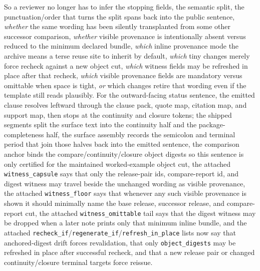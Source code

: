 \documentclass[11pt]{article}
\begin{document}
So a reviewer no longer has to infer the stopping fields, the semantic split, the punctuation/order that turns the split spans back into the public sentence, \emph{whether} the same wording has been silently transplanted from some other successor comparison, \emph{whether} visible provenance is intentionally absent versus reduced to the minimum declared bundle, \emph{which} inline provenance mode the archive means a terse reuse site to inherit by default, \emph{which} tiny changes merely force recheck against a new object cut, \emph{which} witness fields may be refreshed in place after that recheck, \emph{which} visible provenance fields are mandatory versus omittable when space is tight, \emph{or} which changes retire that wording even if the template still reads plausibly.
For the outward-facing status sentence, the emitted clause resolves leftward through the clause pack, quote map, citation map, and support map, then stops at the continuity and closure tokens; the shipped segments split the surface text into the continuity half and the package-completeness half, the surface assembly records the semicolon and terminal period that join those halves back into the emitted sentence, the comparison anchor binds the compare/continuity/closure object digests so this sentence is only certified for the maintained worked-example object cut, the attached \texttt{witness\_capsule} says that only the release-pair ids, compare-report id, and digest witness may travel beside the unchanged wording as visible provenance, the attached \texttt{witness\_floor} says that whenever any such visible provenance is shown it should minimally name the base release, successor release, and compare-report cut, the attached \texttt{witness\_omittable} tail says that the digest witness may be dropped when a later note prints only that minimum inline bundle, and the attached \texttt{recheck\_if}/\texttt{regenerate\_if}/\texttt{refresh\_in\_place} lists now say that anchored-digest drift forces revalidation, that only \texttt{object\_digests} may be refreshed in place after successful recheck, and that a new release pair or changed continuity/closure terminal targets force reissue.
\end{document}
